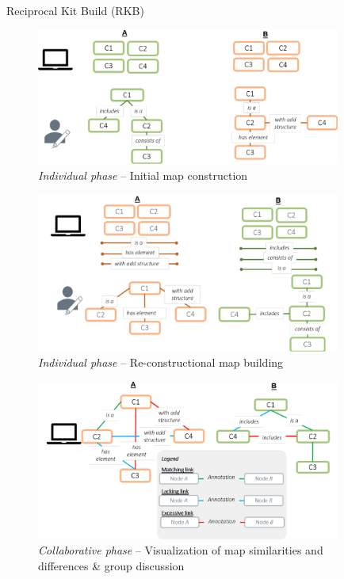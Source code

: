 \begin{frame}[allowframebreaks]{Reciprocal Kit Build (RKB)}

    \begin{figure}[tb]
        \begin{center}
            \includegraphics[width=100mm]{images/RKB_p1.pdf}
        \end{center}
        \caption{\emph{Individual phase} -- Initial map construction}
        \label{intro::rkb_p1}
    \end{figure}
    
    \begin{figure}[tb]
        \begin{center}
            \includegraphics[width=100mm]{images/RKB_p2.pdf}
        \end{center}
        \caption{\emph{Individual phase} -- Re-constructional map building}
        \label{intro::rkb_p2}
    \end{figure}
    
    \begin{figure}[tb]
        \begin{center}
            \includegraphics[width=100mm]{images/RKB_p3.pdf}
        \end{center}
        \caption{\emph{Collaborative phase} -- Visualization of map similarities and differences \& group discussion}
        \label{intro::rkb_p3}
    \end{figure}
    

\end{frame}

